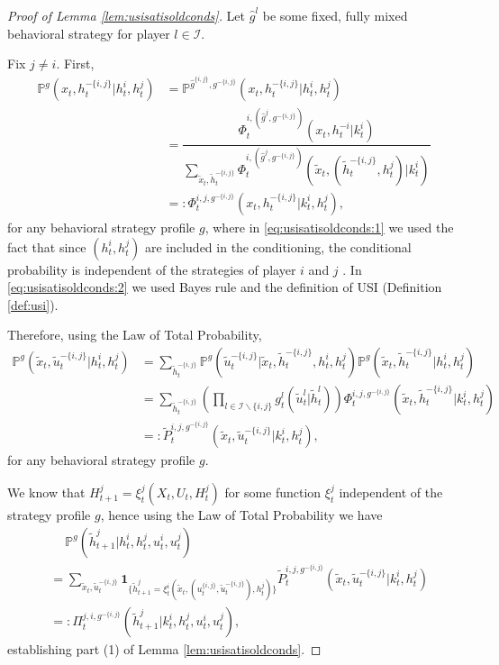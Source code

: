 \documentclass[pdflatex,sn-basic]{sn-jnl}
\renewcommand{\Pr}{\mathbb{P}}
\newcommand{\es}{\enspace\enspace\:}
\newcommand{\comp}{k}
\theoremstyle{thmstyleone}%
\theoremstyle{thmstyletwo}%
\theoremstyle{thmstylethree}%
\begin{document}
\begin{appendices}
\begin{proof}[Proof of Lemma \ref{lem:usisatisoldconds}]
	Let $\hat{g}^l$ be some fixed, fully mixed behavioral strategy for player $l\in\mathcal{I}$. 
	
	Fix $j\neq i$. First,
	\begin{align}
		\Pr^g(x_t, h_t^{-\{i, j\}}| h_t^i, h_t^j) &= \Pr^{\hat{g}^{\{i, j\}}, g^{-\{i, j\}} } (x_t, h_t^{-\{i, j\}}| h_t^i, h_t^j)\label{eq:usisatisoldconds:1} \\
		&=\dfrac{\Phi_t^{i, (\hat{g}^j, g^{-\{i, j\}}) }(x_t, h_t^{-i}|\comp_t^i) }{\sum_{\tilde{x}_t,\tilde{h}_t^{-\{i, j\}}} \Phi_t^{i, (\hat{g}^j, g^{-\{i, j\}})}(\tilde{x}_t, (\tilde{h}_t^{-\{i, j\}}, h_t^j)|\comp_t^i)}\label{eq:usisatisoldconds:2} \\
		&=:\Phi_t^{i, j, g^{-\{i, j\}}}(x_t, h_t^{-\{i, j\}}| \comp_t^i, h_t^j),
	\end{align}
	for any behavioral strategy profile $g$, {where in \eqref{eq:usisatisoldconds:1} we used the fact that since $(h_t^i, h_t^j)$ are included in the conditioning, the conditional probability is independent of the strategies of player $i$ and $j$ \citep[Section 6.5]{kumar1986stochastic}. 
    In \eqref{eq:usisatisoldconds:2} we used Bayes rule and the definition of USI (Definition \ref{def:usi}).}
	
	Therefore, {using the Law of Total Probability,}
	\begin{align}
		\Pr^g(\tilde{x}_t, \tilde{u}_t^{-\{i,j\}}|h_t^i, h_t^j) &= \sum_{\tilde{h}_t^{-\{i, j\}}} \Pr^g(\tilde{u}_t^{-\{i,j\}}|\tilde{x}_t, \tilde{h}_t^{-\{i, j\}}, h_t^i, h_t^j) \Pr^g(\tilde{x}_t, \tilde{h}_t^{-\{i, j\}}| h_t^i, h_t^j)\\
		&= \sum_{\tilde{h}_t^{-\{i, j\}}} \left(\prod_{l \in \mathcal{I}\backslash\{i,j\} }g_t^l(\tilde{u}_t^l|\tilde{h}_t^l) \right) \Phi_t^{i, j, g^{-\{i, j\}}}(\tilde{x}_t, \tilde{h}_t^{-\{i, j\}}| \comp_t^i, h_t^j)\\
		&=: \tilde{P}_t^{i, j, g^{-\{i, j\}}}(\tilde{x}_t, \tilde{u}_t^{-\{i, j\}}|\comp_t^i, h_t^j),
	\end{align}
	for any behavioral strategy profile $g$.
	
	We know that $H_{t+1}^j = \xi_t^j(X_t, U_t, H_t^j)$ for some function $\xi_t^j$ independent of the strategy profile $g$, hence {using the Law of Total Probability we have}
	\begin{align}
		&\es\Pr^g(\tilde{h}_{t+1}^j|h_t^i, h_t^j, u_t^i, u_t^j) \\
		&= \sum_{\tilde{x}_t, \tilde{u}_t^{-\{i, j\}}} \bm{1}_{\{\tilde{h}_{t+1}^j = \xi_t^i(\tilde{x}_t, (u_t^{\{i, j\}},  \tilde{u}_t^{-\{i, j\}}), h_t^j) \} } \tilde{P}_t^{i, j, g^{-\{i, j\}}}(\tilde{x}_t, \tilde{u}_t^{-\{i, j\}}|\comp_t^i, h_t^j)\\
		&=:\Pi_t^{j, i, g^{-\{i, j\}}}(\tilde{h}_{t+1}^j|\comp_t^i, h_t^j, u_t^i, u_t^j),
	\end{align}
	establishing part (1) of Lemma \ref{lem:usisatisoldconds}.
	

\end{proof}
\end{appendices}
\end{document}
